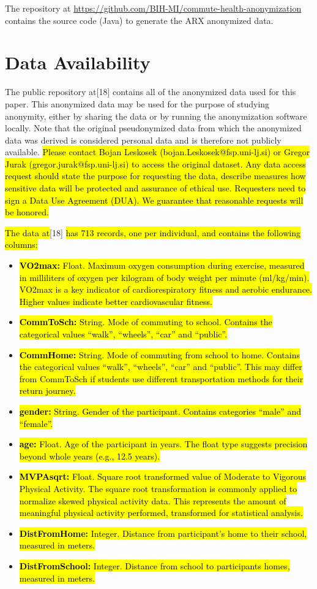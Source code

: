 \documentclass[10pt]{article}
\newcommand{\mycite}[1]{[#1]}
\begin{document}
The repository at {\small \url{https://github.com/BIH-MI/commute-health-anonymization}} contains the source code (Java) to generate the ARX anonymized data.

\section*{Data Availability}

The public repository at\mycite{18} contains all of the anonymized data used for this paper. This anonymized data may be used for the purpose of studying anonymity, either by sharing the data or by running the anonymization software locally. Note that the original pseudonymized data from which the anonymized data was derived is considered personal data and is therefore not publicly available.  \hl{Please contact Bojan Leskosek (bojan.Leskosek@fsp.uni-lj.si) or Gregor Jurak (gregor.jurak@fsp.uni-lj.si) to access the original dataset. Any data access request should state the purpose for requesting the data, describe measures how sensitive data will be protected and assurance of ethical use. Requesters need to sign a Data Use Agreement (DUA). We guarantee that reasonable requests will be honored. }

\hl{The data at}\mycite{18} \hl{has 713 records, one per individual, and contains the following columns:}

\begin{itemize}
\item \hl{\textbf{VO2max:} Float.  Maximum oxygen consumption during exercise, measured in milliliters of oxygen per kilogram of body weight per minute (ml/kg/min). VO2max is a key indicator of cardiorespiratory fitness and aerobic endurance. Higher values indicate better cardiovascular fitness.}
\item \hl{\textbf{CommToSch:} String.  Mode of commuting to school. Contains the categorical values ``walk'', ``wheels'', ``car'' and ``public''.}
\item \hl{\textbf{CommHome:} String.  Mode of commuting from school to home. Contains the categorical values ``walk'', ``wheels'', ``car'' and ``public''. This may differ from CommToSch if students use different transportation methods for their return journey.}
\item \hl{\textbf{gender:} String.  Gender of the participant. Contains categories ``male'' and ``female''.}
\item \hl{\textbf{age:} Float.  Age of the participant in years. The float type suggests precision beyond whole years (e.g., 12.5 years).}
\item \hl{\textbf{MVPAsqrt:} Float.  Square root transformed value of Moderate to Vigorous Physical Activity. The square root transformation is commonly applied to normalize skewed physical activity data. This represents the amount of meaningful physical activity performed, transformed for statistical analysis.}
\item \hl{\textbf{DistFromHome:} Integer.  Distance from participant's home to their school, measured in meters.}
\item \hl{\textbf{DistFromSchool:} Integer.  Distance from school to participants homes, measured in meters.}
\end{itemize}
\end{document}
